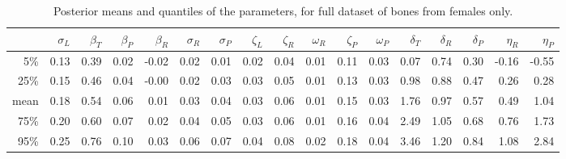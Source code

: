 \documentclass[12pt]{article}
\begin{document}
\begin{table}[ht]
    \footnotesize
\centering
\begin{tabular}{rrrrrrrrrrrrrrrrr}
  \hline
        &  $\sigma_L$  &  $\beta_T$  &  $\beta_P$  &  $\beta_R$  &  $\sigma_R$  &  $\sigma_P$  &  $\zeta_L$  &  $\zeta_R$  &  $\omega_R$  &  $\zeta_P$  &  $\omega_P$  &  $\delta_T$  &  $\delta_R$  &  $\delta_P$  &  $\eta_R$  &  $\eta_P$  \\
\hline
5\%     &  0.13        &  0.39       &  0.02       &  -0.02      &  0.02        &  0.01        &  0.02       &  0.04       &  0.01        &  0.11       &  0.03        &  0.07        &  0.74        &  0.30        &  -0.16     &  -0.55     \\
25\%    &  0.15        &  0.46       &  0.04       &  -0.00      &  0.02        &  0.03        &  0.03       &  0.05       &  0.01        &  0.13       &  0.03        &  0.98        &  0.88        &  0.47        &  0.26      &  0.28      \\
mean    &  0.18        &  0.54       &  0.06       &  0.01       &  0.03        &  0.04        &  0.03       &  0.06       &  0.01        &  0.15       &  0.03        &  1.76        &  0.97        &  0.57        &  0.49      &  1.04      \\
75\%    &  0.20        &  0.60       &  0.07       &  0.02       &  0.04        &  0.05        &  0.03       &  0.06       &  0.01        &  0.16       &  0.04        &  2.49        &  1.05        &  0.68        &  0.76      &  1.73      \\
95\%    &  0.25        &  0.76       &  0.10       &  0.03       &  0.06        &  0.07        &  0.04       &  0.08       &  0.02        &  0.18       &  0.04        &  3.46        &  1.20        &  0.84        &  1.08      &  2.84      \\
   \hline
\end{tabular}
\caption{ \label{tab:females_posterior_distrns} Posterior means and quantiles of the parameters, for full dataset of bones from females only.  
}
\end{table}
\end{document}
